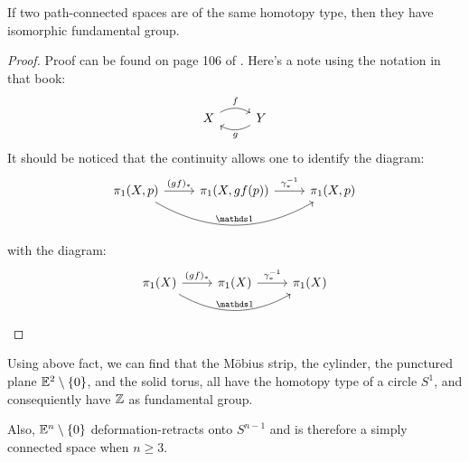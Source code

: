 \begin{thm}
    If two path-connected spaces are of the same homotopy type, then
    they have isomorphic fundamental group.
\end{thm}
\begin{proof}
    Proof can be found on page 106 of \cite{book}. Here's a note using
    the notation in that book:
    $$ \begin{tikzcd}[]
        X\ar[r,"f",bend left] & Y\ar[l,"g",bend left]
    \end{tikzcd}$$
    It should be noticed that the continuity allows one to identify the
    diagram:
    $$ \begin{tikzcd}[]
        \pi_1(X,p)\ar[r,"(gf)_*"]\ar[rr,"\id",bend right]
            &\pi_1(X,gf(p))\ar[r,"\gamma^{-1}_*"]
            &\pi_1(X,p)
    \end{tikzcd} $$
    with the diagram:
    $$ \begin{tikzcd}[]
        \pi_1(X)\ar[r,"(gf)_*"]\ar[rr,"\id",bend right]
            &\pi_1(X)\ar[r,"\gamma^{-1}_*"]
            &\pi_1(X)
    \end{tikzcd} $$
\end{proof}

\begin{fact}
Using above fact, we can find that the M\"obius strip, the cylinder,
the punctured plane $\mathbb{E}^2\setminus\{0\}$, and the solid torus, all
have the homotopy type of a circle $S^1$, and consequiently have $\mathbb{Z}$
as fundamental group.
\end{fact}
\begin{fact}
    Also, $\mathbb{E}^n\setminus\{0\}$ deformation-retracts onto $S^{n-1}$ and
    is therefore a simply connected space when $n\geq 3$.
\end{fact}

